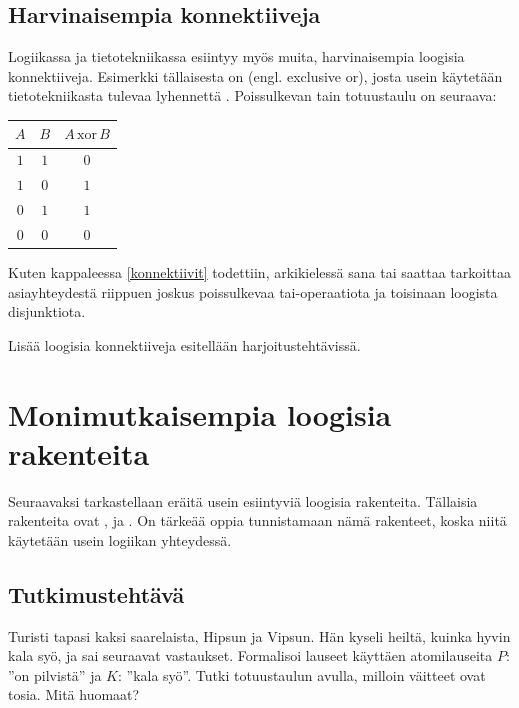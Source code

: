 \subsection*{Harvinaisempia konnektiiveja}
Logiikassa ja tietotekniikassa esiintyy myös muita, harvinaisempia loogisia konnektiiveja. Esimerkki tällaisesta on  (engl. exclusive or), josta usein käytetään tietotekniikasta tulevaa lyhennettä . Poissulkevan tain totuustaulu on seuraava:

\bigskip

\begin{center}
\begin{tabular}{|c|c|c|}\hline
$A$ & $B$ & $A\,\mathrm{xor}\,B$ \\ \hline
$1$ & $1$ & $0$\\ %
$1$ & $0$ & $1$\\
$0$ & $1$ & $1$\\
$0$ & $0$ & $0$\\ \hline
\end{tabular}
\end{center}

\bigskip

Kuten kappaleessa \ref{konnektiivit} todettiin, arkikielessä sana tai saattaa tarkoittaa asiayhteydestä riippuen joskus poissulkevaa tai-operaatiota ja toisinaan loogista disjunktiota.

Lisää loogisia konnektiiveja esitellään harjoitustehtävissä.


\section{Monimutkaisempia loogisia rakenteita}
\label{monimloog}
Seuraavaksi tarkastellaan eräitä usein esiintyviä loogisia rakenteita. Tällaisia rakenteita ovat ,  ja . On tärkeää oppia tunnistamaan nämä rakenteet, koska niitä käytetään usein logiikan yhteydessä.

\subsection*{Tutkimustehtävä}
Turisti tapasi kaksi saarelaista, Hipsun ja Vipsun. Hän kyseli heiltä, kuinka hyvin kala syö, ja sai seuraavat vastaukset.
Formalisoi lauseet käyttäen atomilauseita $P$: ''on pilvistä'' ja $K$: ''kala syö''. Tutki totuustaulun avulla, milloin väitteet ovat tosia. Mitä huomaat?

